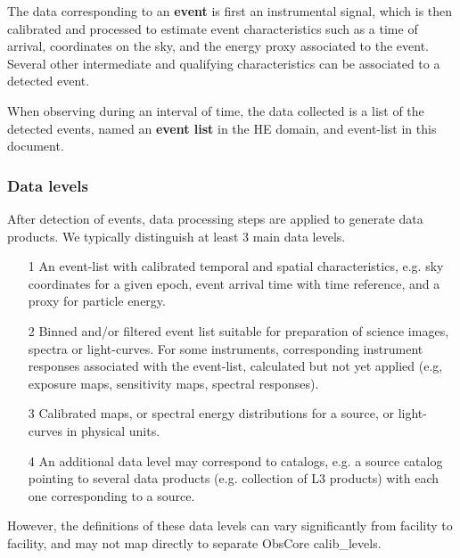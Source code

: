 \documentclass[11pt,a4paper]{ivoa}
\begin{document}
The data corresponding to an \textbf{event} is first an instrumental signal, which is then calibrated and processed to estimate event characteristics such as a time of arrival, coordinates on the sky, and the energy proxy associated to the event. Several other intermediate and qualifying characteristics can be associated to a detected event.

When observing during an interval of time, the data collected is a list of the detected events, named an \textbf{event list} in the HE domain, and event-list in this document.




\subsubsection{Data levels}

After detection of events, data processing steps are applied to generate data products. We typically distinguish at least 3 main data levels. 

\begin{itemize}
    \item[1] An event-list with calibrated temporal and spatial characteristics, e.g. sky coordinates for a given epoch, event arrival time with time reference, and a proxy for particle energy.
    \item[2] Binned and/or filtered event list suitable for preparation of science images, spectra or light-curves.  For some instruments, corresponding instrument responses associated with the event-list, calculated but not yet applied (e.g, exposure maps, sensitivity maps, spectral responses).
    \item[3] Calibrated maps, or spectral energy distributions for a source, or light-curves in physical units.
    \item[4] An additional data level may correspond to catalogs, e.g. a source catalog pointing to several data products (e.g. collection of L3 products) with each one corresponding to a source. 
\end{itemize}

However, the definitions of these data levels can vary significantly from facility to facility, and may not map directly to separate ObsCore calib\_levels.  
\end{document}
